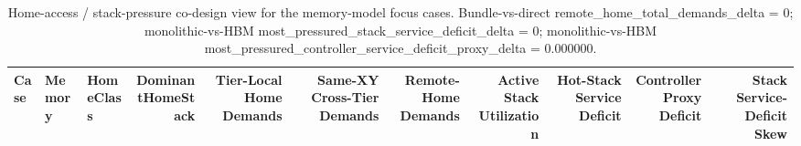 \begin{table}[t]
  \centering
  \caption{Home-access / stack-pressure co-design view for the memory-model focus cases. Bundle-vs-direct remote\_home\_total\_demands\_delta = 0; monolithic-vs-HBM most\_pressured\_stack\_service\_deficit\_delta = 0; monolithic-vs-HBM most\_pressured\_controller\_service\_deficit\_proxy\_delta = 0.000000.}
  \begin{tabular}{l l l r r r r r r r r}
  \hline
  Case & Memory & HomeClass & DominantHomeStack & Tier-Local Home Demands & Same-XY Cross-Tier Demands & Remote-Home Demands & Active Stack Utilization & Hot-Stack Service Deficit & Controller Proxy Deficit & Stack Service-Deficit Skew \\
  \hline
  \hline
  \end{tabular}
\end{table}
